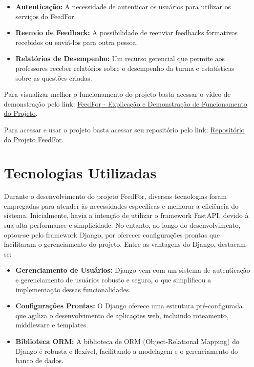 \begin{itemize}
    \item \textbf{Autenticação:} A necessidade de autenticar os usuários para utilizar os serviços do FeedFor.
    \item \textbf{Reenvio de Feedback:} A possibilidade de reenviar feedbacks formativos recebidos ou enviá-los para outra pessoa.
    \item \textbf{Relatórios de Desempenho:} Um recurso gerencial que permite aos professores receber relatórios sobre o desempenho da turma e estatísticas sobre as questões criadas.
\end{itemize}

Para visualizar melhor o funcionamento do projeto basta acessar o vídeo de demonstração pelo link: \href{https://youtu.be/KL6FrNapAPk}{FeedFor - Explicação e Demonstração de Funcionamento do Projeto}.

Para acessar e usar o projeto basta acessar seu repositório pelo link: \href{https://github.com/oCaioOliveira/FeedFor}{Repositório do Projeto FeedFor}.

\section{Tecnologias Utilizadas}

Durante o desenvolvimento do projeto FeedFor, diversas tecnologias foram empregadas para atender às necessidades específicas e melhorar a eficiência do sistema. Inicialmente, havia a intenção de utilizar o framework FastAPI, devido à sua alta performance e simplicidade. No entanto, ao longo do desenvolvimento, optou-se pelo framework Django, por oferecer configurações prontas que facilitaram o gerenciamento do projeto. Entre as vantagens do Django, destacam-se:

\begin{itemize}
    \item \textbf{Gerenciamento de Usuários:} Django vem com um sistema de autenticação e gerenciamento de usuários robusto e seguro, o que simplificou a implementação dessas funcionalidades.
    \item \textbf{Configurações Prontas:} O Django oferece uma estrutura pré-configurada que agiliza o desenvolvimento de aplicações web, incluindo roteamento, middleware e templates.
    \item \textbf{Biblioteca ORM:} A biblioteca de ORM (Object-Relational Mapping) do Django é robusta e flexível, facilitando a modelagem e o gerenciamento do banco de dados.
\end{itemize}

